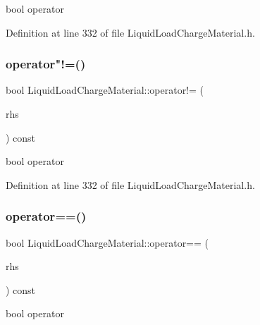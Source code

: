 bool operator 

Definition at line 332 of file Liquid\+Load\+Charge\+Material.\+h.

\mbox{\label{class_liquid_load_charge_material_aa6ad825ee8ab1c7816ce3bf10260c0bb}} 
\subsubsection{\texorpdfstring{operator"!=()}{operator!=()}\hspace{0.1cm}{\footnotesize\ttfamily [3/3]}}
{\footnotesize\ttfamily bool Liquid\+Load\+Charge\+Material\+::operator!= (\begin{DoxyParamCaption}\item[{const \hyperlink{class_liquid_load_charge_material}{Liquid\+Load\+Charge\+Material} \&}]{rhs }\end{DoxyParamCaption}) const\hspace{0.3cm}{\ttfamily [inline]}}

bool operator 

Definition at line 332 of file Liquid\+Load\+Charge\+Material.\+h.

\mbox{\label{class_liquid_load_charge_material_ad2090d1628f26e46339e9e164b47d3a2}} 
\subsubsection{\texorpdfstring{operator==()}{operator==()}\hspace{0.1cm}{\footnotesize\ttfamily [1/3]}}
{\footnotesize\ttfamily bool Liquid\+Load\+Charge\+Material\+::operator== (\begin{DoxyParamCaption}\item[{const \hyperlink{class_liquid_load_charge_material}{Liquid\+Load\+Charge\+Material} \&}]{rhs }\end{DoxyParamCaption}) const\hspace{0.3cm}{\ttfamily [inline]}}

bool operator 

